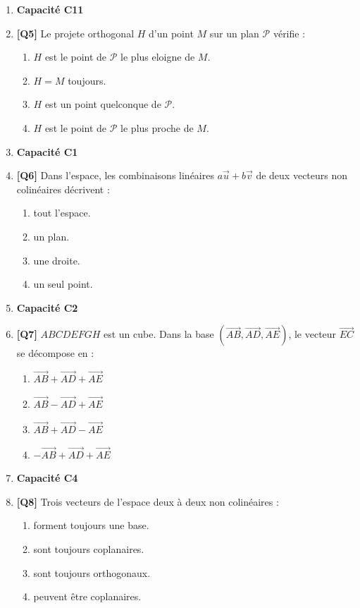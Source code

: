 \begin{enumerate}
\item[] \textbf{Capacité C11}

\item \textbf{[Q5]} Le projete orthogonal $H$ d'un point $M$ sur un plan $\mathcal{P}$ vérifie :
  \begin{enumerate}[label=\Alph*.]
    \item $H$ est le point de $\mathcal{P}$ le plus eloigne de $M$.
    \item $H=M$ toujours.
    \item $H$ est un point quelconque de $\mathcal{P}$.
    \item $H$ est le point de $\mathcal{P}$ le plus proche de $M$.
  \end{enumerate}

\item[] \textbf{Capacité C1}

\item \textbf{[Q6]} Dans l'espace, les combinaisons linéaires $a\vec{u}+b\vec{v}$ de deux vecteurs non colinéaires décrivent :
  \begin{enumerate}[label=\Alph*.]
    \item tout l'espace.
    \item un plan.
    \item une droite.
    \item un seul point.
  \end{enumerate}

\item[] \textbf{Capacité C2}

\item \textbf{[Q7]} $ABCDEFGH$ est un cube. Dans la base $(\vec{AB},\vec{AD},\vec{AE})$, le vecteur $\vec{EC}$ se décompose en :
  \begin{enumerate}[label=\Alph*.]
    \item $\vec{AB}+\vec{AD}+\vec{AE}$
    \item $\vec{AB}-\vec{AD}+\vec{AE}$
    \item $\vec{AB}+\vec{AD}-\vec{AE}$
    \item $-\vec{AB}+\vec{AD}+\vec{AE}$
  \end{enumerate}

\item[] \textbf{Capacité C4}

\item \textbf{[Q8]} Trois vecteurs de l'espace deux à deux non colinéaires :
  \begin{enumerate}[label=\Alph*.]
    \item forment toujours une base.
    \item sont toujours coplanaires.
    \item sont toujours orthogonaux.
    \item peuvent être coplanaires.
  \end{enumerate}


\end{enumerate}
